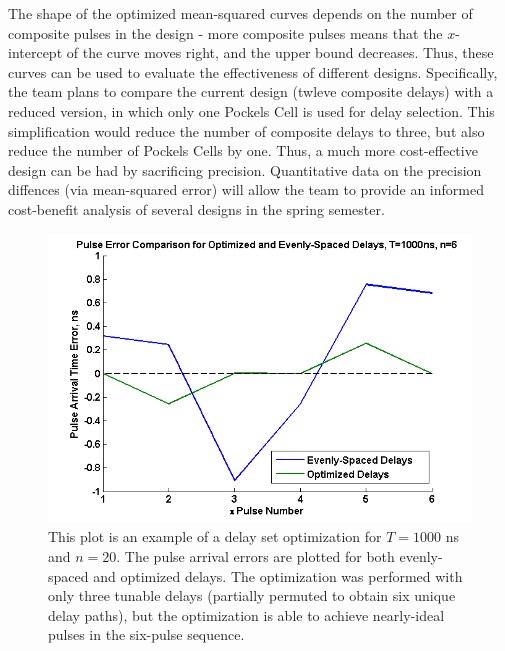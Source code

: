 \documentclass[pdftex,12pt,a4paper]{article}
\begin{document}
The shape of the optimized mean-squared curves depends on the number of composite pulses in the design - more composite pulses means that the $x$-intercept of the curve moves right, and the upper bound decreases. Thus, these curves can be used to evaluate the effectiveness of different designs. Specifically, the team plans to compare the current design (twleve composite delays) with a reduced version, in which only one Pockels Cell is used for delay selection. This simplification would reduce the number of composite delays to three, but also reduce the number of Pockels Cells by one. Thus, a much more cost-effective design can be had by sacrificing precision. Quantitative data on the precision diffences (via mean-squared error) will allow the team to provide an informed cost-benefit analysis of several designs in the spring semester.

\begin{figure}[H]
\centering
\includegraphics[width=0.7\linewidth]{delay_optimization_1us_n20.png}\caption{This plot is an example of a delay set optimization for $T=1000$ ns and $n=20$. The pulse arrival errors are plotted for both evenly-spaced and optimized delays. The optimization was performed with only three tunable delays (partially permuted to obtain six unique delay paths), but the optimization is able to achieve nearly-ideal pulses in the six-pulse sequence.}
\label{fig:optimization_plot}
\end{figure}
\end{document}
